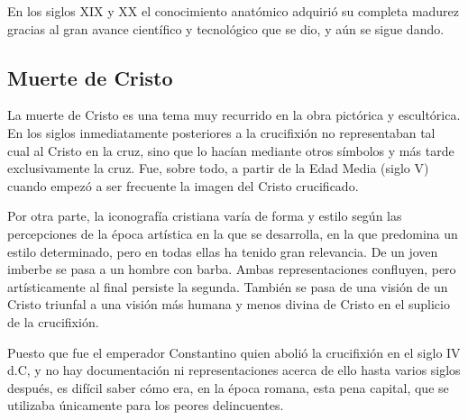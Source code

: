 
En los siglos XIX y XX el conocimiento anatómico adquirió su completa madurez gracias al gran avance científico y tecnológico que se dio, y aún se sigue dando.


\subsection{Muerte de Cristo}
La muerte de Cristo es una tema muy recurrido en la obra pictórica y escultórica. En los siglos inmediatamente posteriores a la crucifixión no representaban tal cual al Cristo en la cruz, sino que lo hacían mediante otros símbolos y más tarde exclusivamente la cruz. Fue, sobre todo, a partir de la Edad Media (siglo V) cuando empezó a ser frecuente la imagen del Cristo crucificado.

Por otra parte, la iconografía cristiana varía de forma y estilo según las percepciones de la época artística en la que se desarrolla, en la que predomina un estilo determinado, pero en todas ellas ha tenido gran relevancia. De un joven imberbe se pasa a un hombre con barba. Ambas representaciones confluyen, pero artísticamente al final persiste la segunda. También se pasa de una visión de un Cristo triunfal a una visión más humana y menos divina de Cristo en el suplicio de la crucifixión.

Puesto que fue el emperador Constantino quien abolió la crucifixión en el siglo IV d.C, y no hay documentación ni representaciones acerca de ello hasta varios siglos después, es difícil saber cómo era, en la época romana, esta pena capital, que se utilizaba únicamente para los peores delincuentes.

